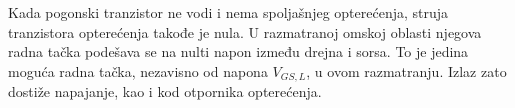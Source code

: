Kada pogonski tranzistor ne vodi i nema spoljašnjeg opterećenja, struja tranzistora opterećenja takođe je nula. U razmatranoj omskoj oblasti njegova radna tačka podešava se na nulti napon između drejna i sorsa. To je jedina moguća radna tačka, nezavisno od napona $V_{GS,L}$, u ovom razmatranju. Izlaz zato dostiže napajanje, kao i kod otpornika opterećenja.

